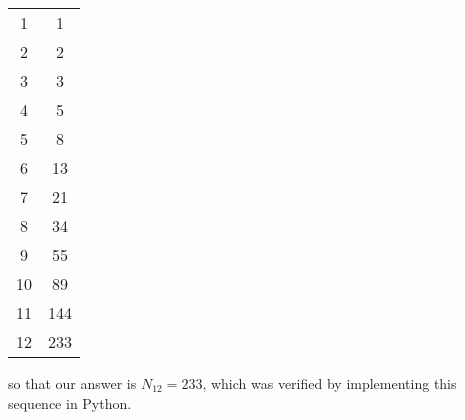 \documentclass{article}
\begin{document}
{\begin{center}
\begin{tabular}{c|c}
      \hline
      1   & 1     \\
      2   & 2     \\
      3   & 3     \\
      4   & 5     \\
      5   & 8     \\
      6   & 13    \\
      7   & 21    \\
      8   & 34    \\
      9   & 55    \\
      10  & 89    \\
      11  & 144   \\
      12  & 233   \\
    \end{tabular}
  \end{center}
  so that our answer is $N_{12} = 233$, which was verified by implementing this sequence in Python.
}







\end{document}
